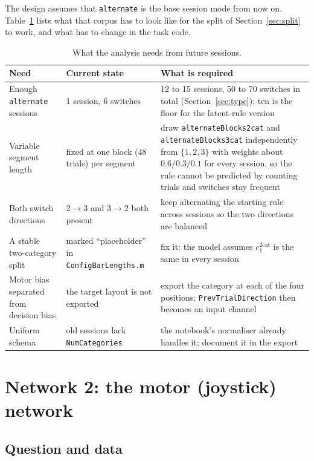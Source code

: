 \documentclass[11pt,a4paper]{article}
\begin{document}
The design assumes that \texttt{alternate} is the base session mode from now on.
Table~\ref{tab:datareq} lists what that corpus has to look like for the split of
Section~\ref{sec:split} to work, and what has to change in the task code.

\begin{table}[H]
  \centering\small
  \caption{What the analysis needs from future sessions.}
  \label{tab:datareq}
  \begin{tabular}{p{3.8cm}p{4.2cm}p{7cm}}
    \toprule
    Need & Current state & What is required \\
    \midrule
    Enough \texttt{alternate} sessions & 1 session, 6 switches & 12 to 15 sessions, 50 to 70 switches in total (Section~\ref{sec:type}); ten is the floor for the latent-rule version \\
    Variable segment length & fixed at one block (48 trials) per segment & draw \texttt{alternateBlocks2cat} and \texttt{alternateBlocks3cat} independently from $\{1, 2, 3\}$ with weights about $0.6/0.3/0.1$ for every session, so the rule cannot be predicted by counting trials and switches stay frequent \\
    Both switch directions & 2$\to$3 and 3$\to$2 both present & keep alternating the starting rule across sessions so the two directions are balanced \\
    A stable two-category split & marked ``placeholder'' in \texttt{ConfigBarLengths.m} & fix it: the model assumes $c_1^{\mathrm{2cat}}$ is the same in every session \\
    Motor bias separated from decision bias & the target layout is not exported & export the category at each of the four positions; \texttt{PrevTrialDirection} then becomes an input channel \\
    Uniform schema & old sessions lack \texttt{NumCategories} & the notebook's normaliser already handles it; document it in the export \\
    \bottomrule
  \end{tabular}
\end{table}

\section{Network 2: the motor (joystick) network}
\label{sec:motor}

\subsection{Question and data}
\end{document}
